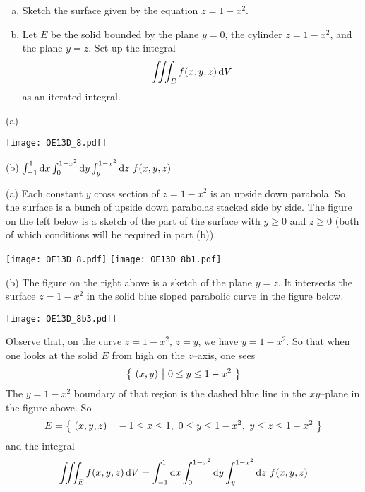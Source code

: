 \begin{question}[M200 2013D] %
\begin{enumerate}[(a)]
\item
Sketch the surface given by the equation $z = 1 - x^2$.
\item
Let $E$ be the solid bounded by the plane $y = 0$, the cylinder 
$z = 1 - x^2$, and the plane $y = z$. Set up the integral
\begin{equation*}
\iiint_E f(x,y,z)\,\mathrm{d}V
\end{equation*}
as an iterated integral.
\end{enumerate}
\end{question}

%

\begin{answer}
(a)
\begin{center}
     \texttt{[image: OE13D\_8.pdf]}
\end{center}

(b) $\int_{-1}^1\dee{x}\int_0^{1-x^2}\dee{y}\int_y^{1-x^2}\dee{z}\ f(x,y,z)$
\end{answer}

\begin{solution}
(a)
Each constant $y$ cross section of $z=1-x^2$ is an upside
down parabola. So the surface is a bunch of upside down parabolas
stacked side by side. The figure on the left below is a sketch of 
the part of the surface with $y\ge 0$
and $z\ge 0$ (both of which conditions will be required in part (b)).

\begin{center}
     \texttt{[image: OE13D\_8.pdf]}\qquad
     \texttt{[image: OE13D\_8b1.pdf]}
\end{center}

(b)
The figure on the right above is a sketch of the plane $y=z$.
It intersects the surface $z=1-x^2$ in the solid blue sloped parabolic
curve in the figure below.

\begin{center}
     \texttt{[image: OE13D\_8b3.pdf]}
\end{center}

Observe that, on the curve $z=1-x^2$, $z=y$, we have
$y=1-x^2$. So that when one looks at the solid $E$ from high on the $z$--axis,
one sees
\begin{equation*}
\big\{ \ (x,y)\ \big|\ 0\le y\le 1-x^2\ \big\}
\end{equation*} 
The $y=1-x^2$ boundary of that region is the dashed blue line in the 
$xy$--plane in the figure above. So 
\begin{equation*}
E = \big\{ \ (x,y,z)\ \big|\ -1\le x\le 1,\ 0\le y\le 1-x^2,\ y\le z\le 1-x^2\ \big\}
\end{equation*}
and the integral
\begin{equation*}
\tripInt_E f(x,y,z)\,\dee{V}
=\int_{-1}^1\dee{x}\int_0^{1-x^2}\dee{y}\int_y^{1-x^2}\dee{z}\ f(x,y,z)
\end{equation*}
\end{solution}


